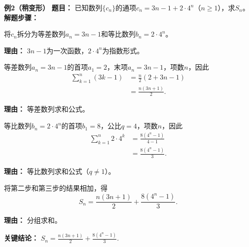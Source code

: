 \begin{examplebox}
	\medskip
	\textbf{\textcolor{CExample}{例2（稍变形）}}
	\textbf{\textcolor{CExample}{题目：}}
	已知数列$\{c_n\}$的通项$c_n=3n-1+2\cdot4^n$（$n\geq1$），求$S_n$。
	\textbf{\textcolor{CExample}{解题步骤：}}
	\begin{description}[style=nextline, leftmargin=2.8em, labelsep=0.5em, itemsep=0.45em]
		\item[\textbf{第一步（通项拆分）：}]
			将$c_n$拆分为等差数列$a_n=3n-1$和等比数列$b_n=2\cdot4^n$。
			\par\textbf{理由：} $3n-1$为一次函数，$2\cdot4^n$为指数形式。
		\item[\textbf{第二步（等差求和）：}]
			等差数列$a_n=3n-1$的首项$a_1=2$，末项$a_n=3n-1$，项数$n$，因此
			\[
				\begin{aligned}
					\sum_{k=1}^{n} (3k-1) &= \frac{n}{2}(2+3n-1) \\ &= \frac{n(3n+1)}{2}.
			\end{aligned}
			\]
			\par\textbf{理由：} 等差数列求和公式。
		\item[\textbf{第三步（等比求和）：}]
			等比数列$b_n=2\cdot4^n$的首项$b_1=8$，公比$q=4$，项数$n$，因此
			\[
				\begin{aligned}
					\sum_{k=1}^{n} 2\cdot4^k &= \frac{8(4^n-1)}{4-1} \\ &= \frac{8(4^n-1)}{3}.
			\end{aligned}
			\]
			\par\textbf{理由：} 等比数列求和公式（$q\neq1$）。
		\item[\textbf{第四步（合并结果）：}]
			将第二步和第三步的结果相加，得
			\[
				S_n = \frac{n(3n+1)}{2} + \frac{8(4^n-1)}{3}.
			\]
			\par\textbf{理由：} 分组求和。
	\end{description}
	\textbf{\textcolor{CExample}{关键结论：}}
	\textbf{$S_n = \frac{n(3n+1)}{2} + \frac{8(4^n-1)}{3}$}.


\end{examplebox}
